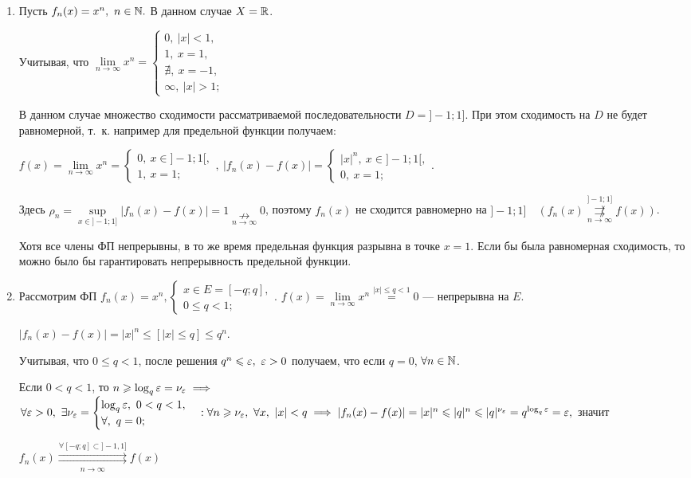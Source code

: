 \documentclass[../../main.tex]{subfiles}
\begin{document}
\begin{exmps}
	\;
	
	\begin{enumerate}
		\item	 Пусть $f_n(x) = x^n,\ n \in \mathbb{N}.$ 
В данном случае $X = \mathbb{R}$. 

Учитывая, что $\underset{n \to \infty}{\lim} x^n = 
\begin{cases}
0,\ |x| < 1, \\
1,\  x = 1, \\
\nexists,\ x = -1, \\
\infty,\ |x| > 1;
\end{cases}$

В данном случае множество сходимости рассматриваемой 
последовательности $D = ]-1;1]$. 
При этом сходимость на $D$ не будет равномерной, т.~к. 
например для предельной функции получаем:

$f(x) = \underset{n \to \infty}{\lim} x^n = 
\begin{cases}
0,\ x \in ]-1;1[, \\
1,\ x = 1;
\end{cases},\
|f_n(x) - f(x)| = 
\begin{cases}
|x|^n,\ x \in ]-1;1[, \\
0,\ x = 1;
\end{cases}
$.

Здесь $\rho_n = \underset{x \in ]-1;1]}{\sup}|f_n(x)-f(x)| = 1 
\underset{n \to \infty}{\nrightarrow} 0$, поэтому
$f_n(x)$ не сходится равномерно на $]-1;1] \quad
(f_n(x) \overset{]-1;1]}{\underset{n \to \infty}
{\not \rightrightarrows}} f(x))$. 

Хотя все члены ФП непрерывны, в то же время предельная функция
разрывна в точке $x=1$. Если бы была равномерная сходимость, 
то можно было бы гарантировать непрерывность предельной функции.

		\item Рассмотрим ФП $f_n(x) = x^n,
\begin{cases}
x \in E = [-q;q], \\
0 \leq q < 1;
\end{cases}.
$
$f(x) = \underset{n \to \infty}{\lim} x^n \overset{|x| \leq q < 1}{=} 0$ ---
непрерывна на $E$.

$|f_n(x) - f(x)| = |x|^n \leq \left[|x| \leq q\right] \leq q^n$.

Учитывая, что $0 \leq q < 1$, после решения 
$q^n \leqslant \varepsilon,\ \varepsilon > 0$ получаем,
что если $q = 0$, $\forall n \in \mathbb{N}$. 

Если $0 < q < 1$, то $n \geqslant \log_q\varepsilon = \nu_\varepsilon \implies$
$\forall \eps > 0,\ \exists \nu_\eps = 
\begin{cases}
\log_q \eps,\ 0 < q < 1, \\
\forall,\ q = 0;
\end{cases} : \forall n \geq \nu_\eps,\ \forall x,\ |x| < q \implies 
|f_n(x) - f(x)| = |x|^n \leq |q|^n \leq |q|^{\nu_\eps} = 
q^{\log_q \eps} = \eps,$ значит

$f_n(x) \overset{\forall [-q;q] \subset ]-1,1]}
{\underset{n \to \infty}\rightrightarrows} f(x)$
	\end{enumerate}
\end{exmps}	
\end{document}
